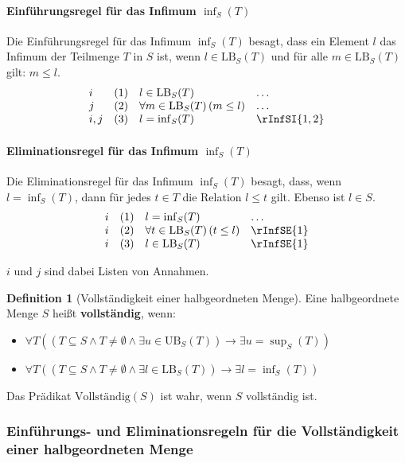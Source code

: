 \documentclass{book}
\theoremstyle{plain}
\theoremstyle{remark}
\theoremstyle{definition}
\newtheorem{definition}{Definition}[section]
\begin{document}
\paragraph{Einführungsregel für das Infimum \(\inf_S(T)\)}
Die Einführungsregel für das Infimum \(\inf_S(T)\) besagt, dass ein Element \( l \) das Infimum der Teilmenge \( T \) in \( S \) ist, wenn \( l \in \text{LB}_S(T) \) und für alle \( m \in \text{LB}_S(T) \) gilt: \( m \leq l \).
\[
\begin{array}{llll}
    i   & (1) & l \in \text{LB}_S(T) & \dots \\
    j   & (2) & \forall m \in \text{LB}_S(T) \, (m \leq l) & \dots \\
    i,j & (3) & l = \inf_S(T) & \rInfSI{1,2}
\end{array}
\]

\paragraph{Eliminationsregel für das Infimum \(\inf_S(T)\)}
Die Eliminationsregel für das Infimum \(\inf_S(T)\) besagt, dass, wenn \( l = \inf_S(T) \), dann für jedes \( t \in T \) die Relation \( l \leq t \) gilt. Ebenso ist \( l \in S \).
\[
\begin{array}{llll}
    i & (1) & l = \inf_S(T) & \dots \\
    i & (2) & \forall t \in \text{LB}_S(T) \, (t \leq l) & \rInfSE{1} \\
    i & (3) & l \in \text{LB}_S(T) & \rInfSE{1}
\end{array}
\]

\(i\) und \(j\) sind dabei Listen von Annahmen.

\begin{definition}[Vollständigkeit einer halbgeordneten Menge]
    Eine halbgeordnete Menge \( S \) heißt \textbf{vollständig}, wenn:
    \begin{itemize}
        \item \(\forall T((T\subseteq S\land T \neq \emptyset\land \exists u \in \text{UB}_S(T)) \rightarrow \exists u = \sup_S(T))\)
        \item \(\forall T((T\subseteq S\land T \neq \emptyset\land \exists l \in \text{LB}_S(T)) \rightarrow \exists l = \inf_S(T))\)
    \end{itemize}
    Das Prädikat \(\text{Vollständig}(S)\) ist wahr, wenn \( S \) vollständig ist.
\end{definition}

\subsubsection{Einführungs- und Eliminationsregeln für die Vollständigkeit einer halbgeordneten Menge}
\label{rule:rCompleteI} \label{rule:rCompleteE}
\end{document}
